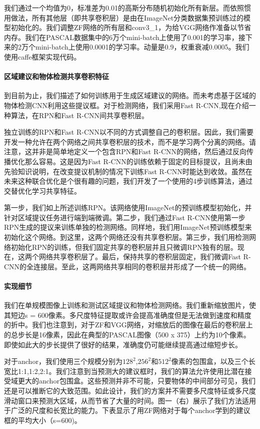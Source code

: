 \documentclass[12pt,a4paper,titlepage]{article}
\begin{document}
我们通过一个均值为0，标准差为0.01的高斯分布随机初始化所有新层。而依照惯用做法，所有其他层（即共享卷积层）是由在ImageNet分类数据集预训练过的模型初始化的。我们调整ZF网络的所有层和conv3\_1，为给VGG网络作准备以节省内存。我们在PASCAL数据集中的6万个mini-batch上使用了0.001的学习率，接下来的2万个mini-batch上使用0.0001的学习率。动量是0.9，权重衰减0.0005。我们使用caffe框架实现代码。

\paragraph{区域建议和物体检测共享卷积特征}
到目前为止，我们描述了如何训练用于生成区域建议的网络。而未考虑基于区域的物体检测CNN利用这些提议框。对于检测网络，我们采用Fast R-CNN,现在介绍一种算法，在RPN和Fast R-CNN间共享卷积层。\par

独立训练的RPN和Fast R-CNN以不同的方式调整自己的卷积层。因此，我们需要开发一种允许在两个网络之间共享卷积层的技术，而不是学习两个分离的网络。请注意，这并非是简单地定义一个包含RPN和Fast R-CNN的网络，然后通过反向传播优化那么容易。这是因为Fast R-CNN的训练依赖于固定的目标提议，且尚未由先验知识说明，在改变提议机制的情况下训练Fast R-CNN时能达到收敛。虽然在未来这种联合优化是个很有趣的问题，我们开发了一个使用的4步训练算法，通过交替优化学习共享特征。\par

第一步，我们如上所述训练RPN。该网络使用ImageNet的预训练模型初始化，并针对区域提议任务进行端到端微调。第二步，我们通过Fast R-CNN使用第一步RPN生成的提议来训练单独的检测网络。同样地，我们用ImageNet预训练模型来初始化这个网络。到这里，这两个网络还没有共享卷积层。第三步，我们用检测网络初始化RPN的训练，但我们固定共享的卷积层并且只微调RPN独有的层。现在，这两个网络共享卷积层了。最后，保持共享的卷积层固定，我们微调Fast R-CNN的全连接层。至此，这两网络共享相同的卷积层并形成了一个统一的网络。

\paragraph{实现细节}
我们在单规模图像上训练和测试区域提议和物体检测网络。我们重新缩放图片，使其短边s = 600像素。多尺度特征提取或许会提高准确度但是无法做到速度和精度的折中。我们也注意到，对于ZF和VGG网络，对缩放后的图像在最后的卷积层上的总步长是16像素，因此在典型的PASCAL图像（500 x 375）上约为10个像素。即使如此大的步长提供了很好的结果，准确度仍可能继续提高通过缩短步长。\par

对于anchor，我们使用三个规模分别为$128^2$,$256^2$和$512^2$像素的包围盒，以及三个长宽比1:1,1:2,2:1。我们注意到当预测大的建议框时，我们的算法允许使用比潜在接受域更大的anchor包围盒。这些预测并非不可能，只要物体的中间部分可见，我们还是可以推断它的大致范围。如此设计，我们的方案并不需要多尺度特征或多尺度滑动窗口来预测大区域，从而节省了大量的时间。图一（右）展示了我们方法适用于广泛的尺度和长宽比的能力。下表显示了用ZF网络对于每个anchor学到的建议框的平均大小（s=600)。\par
\end{document}
